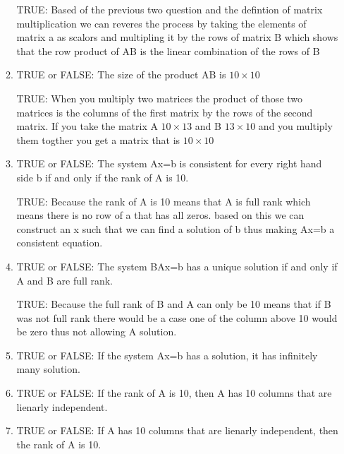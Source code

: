 \documentclass{article}
\begin{document}
\begin{enumerate}
\begin{enumerate}
        \vspace{0.5cm}
        \par
        TRUE: Based of the previous two question and the defintion of matrix multiplication we can reveres the process by taking the elements of matrix a as scalors and multipling it by the rows of matrix B which shows that the row product of AB is the linear combination of the rows of B
        \vspace{0.5cm}
      \item TRUE or FALSE: The size of the product AB is $10 \times 10$
        \vspace{0.5cm}
        \par
        TRUE: When you multiply two matrices the product of those two matrices is the columns of the first matrix by the rows of the second matrix. If you take the matrix A $10 \times 13$ and B $13 \times 10$ and you multiply them togther you get a matrix that is $10 \times 10$
        \vspace{0.5cm}
      \item TRUE or FALSE: The system Ax=b is consistent for every right hand side b if and only if the rank of A is 10.
        \vspace{0.5cm}
        \par
        TRUE: Because the rank of A is 10 means that A is full rank which means there is no row of a that has all zeros. based on this we can construct an x such that we can find a solution of b thus making Ax=b a consistent equation.
        \vspace{0.5cm}
      \item TRUE or FALSE: The system BAx=b has a unique solution if and only if A and B are full rank.
        \vspace{0.5cm}
        \par
        TRUE: Because the full rank of B and A can only be 10 means that if B was not full rank there would be a case one of the column above 10 would be zero thus not allowing A solution.
        \vspace{0.5cm}
      \item TRUE or FALSE: If the system Ax=b has a solution, it has infinitely many solution.
        \vspace{0.5cm}
        \par
        \vspace{0.5cm}
      \item TRUE or FALSE: If the rank of A is 10, then A has 10 columns that are lienarly independent.
        \vspace{0.5cm}
        \par
        \vspace{0.5cm}
      \item TRUE or FALSE: If A has 10 columns that are lienarly independent, then the rank of A is 10.
        \vspace{0.5cm}
        \par
        \vspace{0.5cm}
    \end{enumerate}


\end{enumerate}
\end{document}
